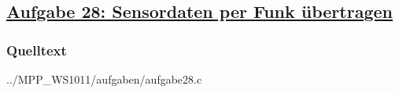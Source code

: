 \subsection*
{\href{http://cst.mi.fu-berlin.de/intern/19606-P-MPP/Aufgaben/041102.html}
{Aufgabe 28: Sensordaten per Funk übertragen}}

\subsubsection*{Quelltext}


{../MPP_WS1011/aufgaben/aufgabe28.c}

